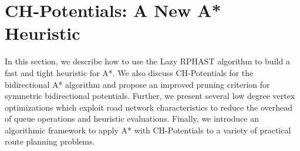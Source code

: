 \documentclass[manuscript,review]{acmart}
\begin{document}


\section{CH-Potentials: A New A* Heuristic}\label{sec:main-algo}

In this section, we describe how to use the Lazy RPHAST algorithm to build a fast and tight heuristic for A*.
We also discuss CH-Potentials for the bidirectional A* algorithm and propose an improved pruning criterion for symmetric bidirectional potentials.
Further, we present several low degree vertex optimizations which exploit road network characteristics to reduce the overhead of queue operations and heuristic evaluations.
Finally, we introduce an algorithmic framework to apply A* with CH-Potentials to a variety of practical route planning problems.
\end{document}
